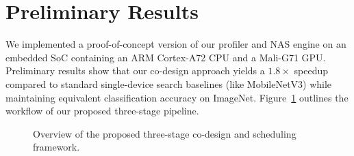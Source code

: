 \section{Preliminary Results}
We implemented a proof-of-concept version of our profiler and NAS engine on an embedded SoC containing an ARM Cortex-A72 CPU and a Mali-G71 GPU. Preliminary results show that our co-design approach yields a $1.8\times$ speedup compared to standard single-device search baselines (like MobileNetV3) while maintaining equivalent classification accuracy on ImageNet. Figure~\ref{fig:pipeline} outlines the workflow of our proposed three-stage pipeline.

\begin{figure}[htbp]
    \centering
    \caption{Overview of the proposed three-stage co-design and scheduling framework.}
    \label{fig:pipeline}
\end{figure}
